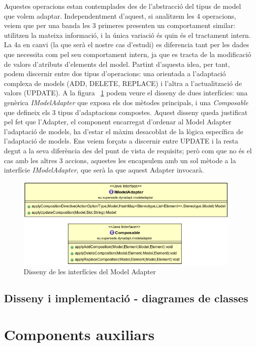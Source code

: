 Aquestes operacions estan contemplades des de l'abstracció del tipus de model que volem adaptar. Independentment d'aquest, si analitzem les 4 operacions, veiem que per una banda les 3 primeres presenten un comportament similar: utilitzen la mateixa informació, i la única variació és quin és el tractament intern. La 4a en canvi (la que serà el nostre cas d'estudi) es diferencia tant per les dades que necessita com pel seu comportament intern, ja que es tracta de la modificació de valors d'atributs d'elements del model. Partint d'aquesta idea, per tant, podem discernir entre dos tipus d'operacions: una orientada a l'adaptació complexa de models (ADD, DELETE, REPLACE) i l'altra a l'actualització de valors (UPDATE). A la figura ~\ref{fig:Figura28} podem veure el disseny de dues interfícies: una genèrica \textit{IModelAdapter} que exposa els dos mètodes principals, i una \textit{Composable} que defineix els 3 tipus d'adaptacions compostes. Aquest disseny queda justificat pel fet que l'Adapter, el component encarregat d'ordenar al Model Adapter l'adaptació de models, ha d'estar el màxim desacoblat de la lògica específica de l'adaptació de models. Ens veiem forçats a discernir entre UPDATE i la resta degut a la seva diferència des del punt de vista de requisits; però com que no és el cas amb les altres 3 accions, aquestes les encapsulem amb un sol mètode a la interfície \textit{IModelAdapter}, que serà la que aquest Adapter invocarà.\\

\begin{figure}
\centering
\includegraphics[width=11cm]{Figures/Figure28}
\decoRule
\caption{Disseny de les interfícies del Model Adapter}
\label{fig:Figura28}
\end{figure}



\subsection{Disseny i implementació - diagrames de classes}

\section{Components auxiliars}

